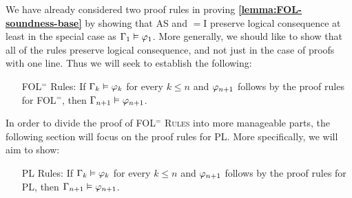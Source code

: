
We have already considered two proof rules in proving \textbf{\ref{lemma:FOL-soundness-base}} by showing that AS and $=$I preserve logical consequence at least in the special case as $\Gamma_1 \vDash \varphi_1$.
More generally, we should like to show that all of the rules preserve logical consequence, and not just in the case of proofs with one line.
Thus we will seek to establish the following:

\begin{enumerate}[leftmargin=1.3in]
  \item[\sc FOL$^=$ Rules:] If $\Gamma_k \vDash \varphi_k$ for every $k\leq n$ and $\varphi_{n+1}$ follows by the proof rules for FOL$^=$, then $\Gamma_{n+1} \vDash \varphi_{n+1}$.
\end{enumerate}

In order to divide the proof of \textsc{FOL$^=$ Rules} into more manageable parts, the following section will focus on the proof rules for PL. 
More specifically, we will aim to show:

\begin{enumerate}[leftmargin=1.3in]
  \item[\sc PL Rules:] If $\Gamma_k \vDash \varphi_k$ for every $k\leq n$ and $\varphi_{n+1}$ follows by the proof rules for PL, then $\Gamma_{n+1} \vDash \varphi_{n+1}$.
\end{enumerate}

